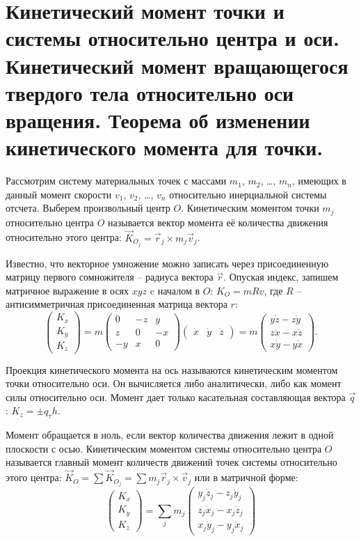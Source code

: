 \chapter{Кинетический момент точки и системы относительно центра и оси.
Кинетический момент вращающегося твердого тела относительно оси вращения.
Теорема об изменении кинетического момента для точки.}

Рассмотрим систему материальных точек с массами \( m_1 \), \( m_2 \), \ldots,
\( m_n \), имеющих в данный момент скорости \( v_1 \), \( v_2 \), \ldots,
\( v_n \) относительно инерциальной системы отсчета. Выберем произвольный центр
\( O \). Кинетическим моментом точки \( m_j \) относительно центра \( O \)
называется вектор момента её количества движения относительно этого центра:
\( \vec{K}_{O_j} = \vec{r}_j \times m_j\vec{v}_j \).

Известно, что векторное умножение можно записать через присоединенную матрицу
первого сомножителя -- радиуса вектора \( \vec{r} \). Опуская индекс, запишем
матричное выражение в осях \( xyz \) c началом в \( O \): \( K_O = mRv \), где
\( R \) -- антисимметричная присоединенная матрица вектора \( r \):
\[
    \begin{pmatrix} K_x \\ K_y \\ K_z \end{pmatrix} =
    m\begin{pmatrix} 0 & -z & y \\ z & 0 & -x \\ -y & x & 0 \end{pmatrix}
    \begin{pmatrix} \dot{x} & \dot{y} & \dot{z} \end{pmatrix} = 
    m\begin{pmatrix} y\dot{z} - z\dot{y} \\ z\dot{x} - x\dot{z} \\
    x\dot{y} - y\dot{x} \end{pmatrix}.
\]
 
Проекция кинетического момента на ось называются кинетическим моментом точки
относительно оси. Он вычисляется либо аналитически, либо как момент силы
относительно оси. Момент дает только касательная составляющая вектора
\( \vec{q} \): \( K_z = \pm q_\tau h \).

Момент обращается в ноль, если вектор количества движения лежит в одной
плоскости с осью. Кинетическим моментом системы относительно центра \( O \)
называется главный момент количеств движений точек системы относительно этого
центра: \( \vec{K}_O = \sum \vec{K}_{O_j} = \sum m_j \vec{r}_j \times
\vec{v}_j \) или в матричной форме:
\[
    \begin{pmatrix} K_x \\ K_y \\ K_z \end{pmatrix} = \sum_j m_j
    \begin{pmatrix} y_j\dot{z}_j - z_j\dot{y}_j \\ z_j\dot{x}_j - x_j\dot{z}_j
    \\ x_j\dot{y}_j - y_j\dot{x}_j \end{pmatrix}
\]


